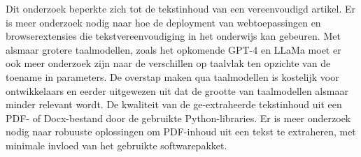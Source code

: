 Dit onderzoek beperkte zich tot de tekstinhoud van een vereenvoudigd artikel. Er is meer onderzoek nodig naar hoe de deployment van webtoepassingen en browserextensies die tekstvereenvoudiging in het onderwijs kan gebeuren. Met alsmaar grotere taalmodellen, zoals het opkomende GPT-4 en LLaMa moet er ook meer onderzoek zijn naar de verschillen op taalvlak ten opzichte van de toename in parameters. De overstap maken qua taalmodellen is kostelijk voor ontwikkelaars en eerder uitgewezen uit dat de grootte van taalmodellen alsmaar minder relevant wordt. De kwaliteit van de ge-extraheerde tekstinhoud uit een PDF- of Docx-bestand door de gebruikte Python-libraries. Er is meer onderzoek nodig naar robuuste oplossingen om PDF-inhoud uit een tekst te extraheren, met minimale invloed van het gebruikte softwarepakket.	